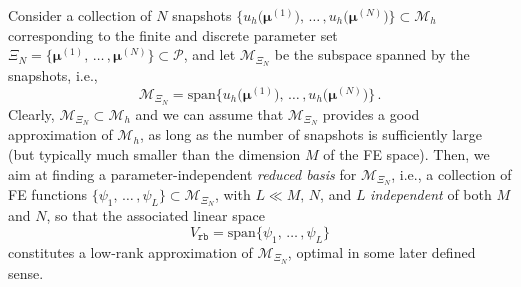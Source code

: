 \documentclass{elsarticle}
\theoremstyle{theorem}
\theoremstyle{definition}
\theoremstyle{remark}
\theoremstyle{proposition}
\numberwithin{figure}{section}
\newcommand{\bg}[1]{\boldsymbol{#1}}
\begin{document}
		Consider a collection of $N$ snapshots $\big\lbrace u_h \big( \bg{\mu}^{(1)} \big), \, \ldots \, , u_h \big( \bg{\mu}^{(N)} \big) \big\rbrace \subset \mathcal{M}_h$ corresponding to the finite and discrete parameter set $\Xi_N = \big\lbrace \bg{\mu}^{(1)}, \, \ldots \, , \bg{\mu}^{(N)} \big\rbrace \subset \mathcal{P}$, and let $\mathcal{M}_{\Xi_N}$ be the subspace spanned by the snapshots, i.e.,
		\begin{equation*}
			\mathcal{M}_{\Xi_N} = \text{span} \big\lbrace u_h \big( \bg{\mu}^{(1)}), \, \ldots \, , u_h(\bg{\mu}^{(N)} \big) \big\rbrace \, .
		\end{equation*}
		Clearly, $\mathcal{M}_{\Xi_N} \subset \mathcal{M}_h$ and we can assume that $\mathcal{M}_{\Xi_N}$ provides a good approximation of $\mathcal{M}_h$, as long as the number of snapshots is sufficiently large (but typically much smaller than the dimension $M$ of the FE space). Then, we aim at finding a parameter-independent \emph{reduced basis} for $\mathcal{M}_{\Xi_N}$, i.e., a collection of FE functions $\big\lbrace \psi_1, \, \ldots \, , \psi_L \big\rbrace \subset \mathcal{M}_{\Xi_N}$, with $L \ll M, \, N$, and $L$ \emph{independent} of both $M$ and $N$, so that the associated linear space 
		\begin{equation*}
			V_{\texttt{rb}} = \text{span} \big\lbrace \psi_1, \, \ldots \, , \psi_L \big\rbrace
		\end{equation*}
		constitutes a low-rank approximation of $\mathcal{M}_{\Xi_N}$, optimal in some later defined sense.
		
\end{document}
